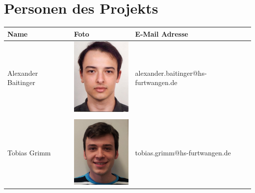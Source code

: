 \chapter*{Personen des Projekts}

\begin{table}[h]
  \sffamily
  \centering
  \small
  \label{tab:Personen}
  \begin{tabular}{m{4cm} m{3cm} m{8cm} }
    \toprule
    Name & Foto & E-Mail Adresse\\
   \midrule

      Alexander Baitinger      & \includegraphics[width=3cm]{Bilder/Personen/Alexander_B.jpg} & alexander.baitinger@hs-furtwangen.de\\\\
   \cmidrule(lr){1-3}
      Tobias Grimm      & \includegraphics[width=3cm]{Bilder/Personen/Tobi_G.jpg} & tobias.grimm@hs-furtwangen.de\\
   \bottomrule
  \end{tabular}
\end{table}